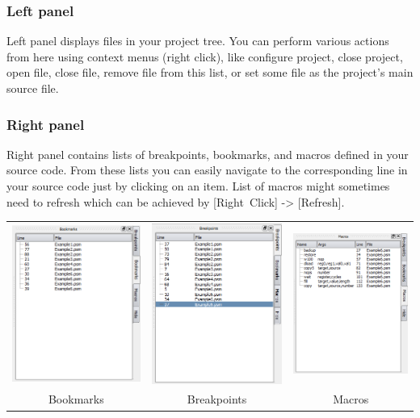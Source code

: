         \subsubsection{Left panel}
            Left panel displays files in your project tree. You can perform various actions from here using context menus (right click), like configure project, close project, open file, close file, remove file from this list, or set some file as the project's main source file.

        \subsubsection{Right panel}
            Right panel contains lists of breakpoints, bookmarks, and macros defined in your source code. From these lists you can easily navigate to the corresponding line in your source code just by clicking on an item. List of macros might sometimes need to refresh which can be achieved by [Right~Click] -> [Refresh].

            \begin{table}[h!]
                \begin{tabular}{ccc}
                    \includegraphics[width=.3\textwidth]{img/listbookmarks.png}
                        &
                    \includegraphics[width=.3\textwidth]{img/listbreakpoints.png}
                        &
                    \includegraphics[width=.3\textwidth]{img/listmacros.png}
                    \\ Bookmarks & Breakpoints & Macros
                \end{tabular}
            \end{table}

